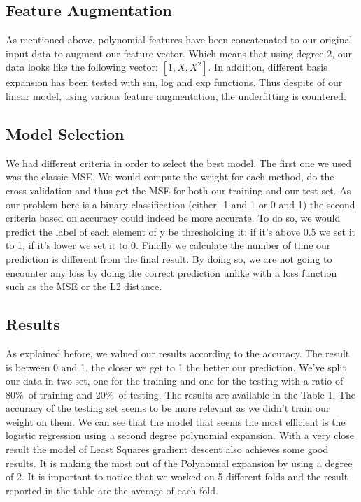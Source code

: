 \documentclass[10pt,conference,compsocconf]{IEEEtran}
\begin{document}
\subsection{Feature Augmentation}
As mentioned above, polynomial features have been concatenated to our original input data to augment our feature vector. Which means that using degree 2, our data looks like the following vector: $[1,X,X^2]$. In addition, different basis expansion has been tested with sin, log and exp functions. Thus despite of our linear model, using various feature augmentation, the underfitting is countered. 


\subsection{Model Selection}
We had different criteria in order to select the best model. The first one we used was the classic MSE. We would compute the weight for each method, do the cross-validation and thus get the MSE for both our training and our test set. As our problem here is a binary classification (either -1 and 1 or 0 and 1) the second criteria based on accuracy could indeed be more accurate. To do so, we would predict the label of each element of y be thresholding it: if it's above 0.5 we set it to 1, if it's lower we set it to 0. Finally we calculate the number of time our prediction is different from the final result. By doing so, we are not going to encounter any loss by doing the correct prediction unlike with a loss function such as the MSE or the L2 distance.\\


\subsection{Results}

As explained before, we valued our results according to the accuracy. The result is between 0 and 1, the closer we get to 1 the better our prediction. We've split our data in two set, one for the training and one for the testing with a ratio of 80\%\ of training and 20\%\ of testing. The results are available in the Table 1. The accuracy of the testing set seems to be more relevant as we didn't train our weight on them. We can see that the model that seems the most efficient is the logistic regression using a second degree polynomial expansion. With a very close result the model of Least Squares gradient descent also achieves some good results. It is making the most out of the Polynomial expansion by using a degree of 2. It is important to notice that we worked on 5 different folds and the result reported in the table are the average of each fold.\\
\end{document}
